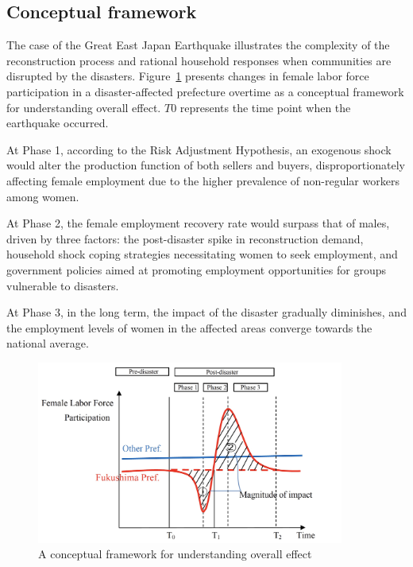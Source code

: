 \documentclass[12pt,halfline,a4paper]{ouparticle}
\begin{document}
\subsection{Conceptual framework}
\label{sec5.1}

The case of the Great East Japan Earthquake illustrates the complexity of the reconstruction process and rational household responses when communities are disrupted by the disasters. Figure~\ref{fig:conceptual_model} presents changes in female labor force participation in a disaster-affected prefecture overtime as a conceptual framework for understanding overall effect. $T0$ represents the time point when the earthquake occurred. 

At Phase 1, according to the Risk Adjustment Hypothesis, an exogenous shock would alter the production function of both sellers and buyers, disproportionately affecting female employment due to the higher prevalence of non-regular workers among women.

At Phase 2, the female employment recovery rate would surpass that of males, driven by three factors: the post-disaster spike in reconstruction demand, household shock coping strategies necessitating women to seek employment, and government policies aimed at promoting employment opportunities for groups vulnerable to disasters.

At Phase 3, in the long term, the impact of the disaster gradually diminishes, and the employment levels of women in the affected areas converge towards the national average.


\begin{figure}[h!]
    \centering
    \includegraphics[width=0.9\textwidth]{A conceptual model.jpeg}  %
    \caption{A conceptual framework for understanding overall effect}
    \label{fig:conceptual_model}
\end{figure}
\end{document}
